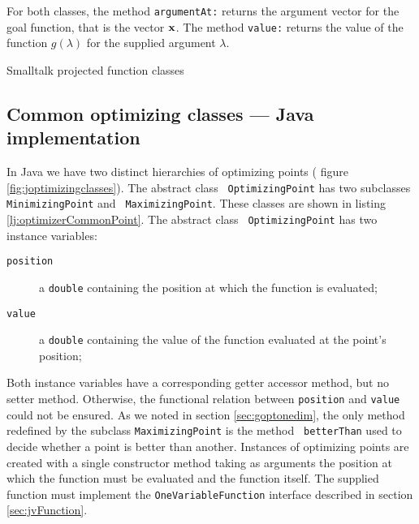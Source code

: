 \documentclass[twoside]{book}
\begin{document}
For both classes, the method {\tt argumentAt:} returns the
argument vector for the goal function, that is the vector ${\bf
x}$. The method {\tt value:} returns the value of the function
$g\left(\lambda\right)$ for the supplied argument $\lambda$.

\begin{listing} Smalltalk projected function classes \label{ls:projectedfunctions}


\end{listing}

\subsection{Common optimizing classes --- Java implementation}
\label{sec:jgeneralOpt}  In
Java we have two distinct hierarchies of optimizing points (\cf
figure \ref{fig:joptimizingclasses}). The abstract class {\tt
OptimizingPoint} has two subclasses {\tt MinimizingPoint} and {\tt
MaximizingPoint}. These classes are shown in listing
\ref{lj:optimizerCommonPoint}. The abstract class {\tt
OptimizingPoint} has two instance variables:
\begin{description}
  \item[\tt position] a {\tt double} containing the position at which the function
  is evaluated;
  \item[\tt value] a {\tt double} containing the value of the function evaluated at the point's position;
\end{description}
Both instance variables have a corresponding getter accessor
method, but no setter method. Otherwise, the functional relation
between {\tt position} and {\tt value} could not be ensured. As we
noted in section \ref{sec:goptonedim}, the only method redefined
by the subclass {\tt MaximizingPoint} is the method {\tt
betterThan} used to decide whether a point is better than another.
Instances of optimizing points are created with a single
constructor method taking as arguments the position at which the
function must be evaluated and the function itself. The supplied
function must implement the {\tt OneVariableFunction} interface
described in section \ref{sec:jvFunction}.
\end{document}
